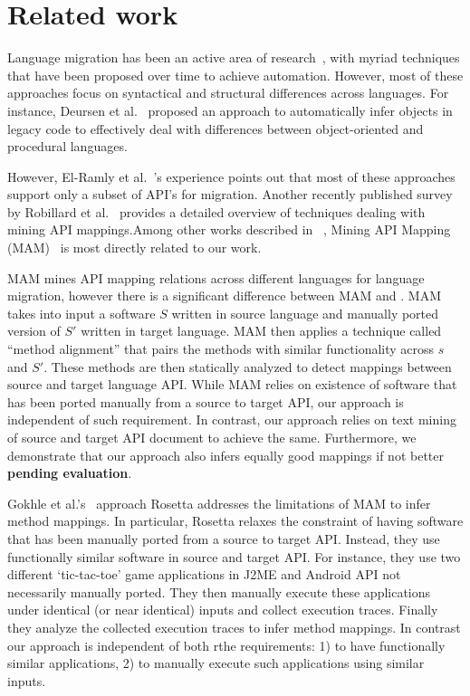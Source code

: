 \section{Related work}
\label{sec:related}

Language migration has been an active area of research~\cite{Hassan2005LAM, Mossienko2003ACJ, vanDeursen1999ICSE, WatersIEEEtranSE88}, with myriad techniques that have been proposed over time to achieve automation. However, most of these approaches focus on syntactical and structural differences across languages. For instance, Deursen et al.~\cite{vanDeursen1999ICSE} proposed an approach to automatically infer objects in legacy code to effectively deal with differences between object-oriented and procedural languages.

However, El-Ramly et al.~\cite{Ramly2006CSA}'s experience points out that most of these approaches support only a subset of API's for migration. Another recently published survey by Robillard et al.~\cite{RobillardIEEEtranSE13} provides a detailed overview of techniques dealing with mining API mappings.Among other works described in ~\cite{RobillardIEEEtranSE13}, Mining API Mapping (MAM)~\cite{Zhong2010ICSE} is most directly related to our work.


MAM mines API mapping relations across different languages for language migration,
however there is a significant difference between MAM and \tool.
MAM takes into input a software $S$ written in source language and manually ported version of $S'$ written in target language.  
MAM then applies a technique called ``method alignment'' that pairs the methods with similar functionality across $s$ and $S'$. These methods are then statically analyzed to detect mappings between source and target language API. While MAM relies on existence of software that has been ported manually from a source to target API, our approach is independent of such requirement. In contrast, our approach relies on text mining of source and target API document to achieve the same. Furthermore, we demonstrate that our approach also infers equally good mappings if not better \textbf{pending evaluation}.


Gokhle et al.'s~\cite{Gokhale2013ICSE} approach Rosetta addresses
the limitations of MAM to infer method mappings.
In particular, Rosetta relaxes the constraint of having 
software that has been manually ported from a source to target API.
Instead, they use functionally similar software in source and target API.
For instance, they use two different `tic-tac-toe' game applications in J2ME and Android API not necessarily manually ported.
They then manually execute these applications under identical (or near identical) inputs and collect execution traces.
Finally they analyze the collected execution traces to infer method mappings.
In contrast our approach is independent of both rthe requirements: 1) to have functionally similar applications, 2) to manually execute such applications using similar inputs.



